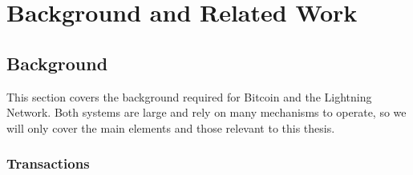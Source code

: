 \chapter{Background and Related Work}
\label{chap:related}

\section{Background}
\label{sec:background}

This section covers the background required for Bitcoin and the Lightning Network. Both systems are large and rely on many mechanisms to operate, so we will only cover the main elements and those relevant to this thesis.

\subsection{Transactions}
\label{subsec:transactions}

